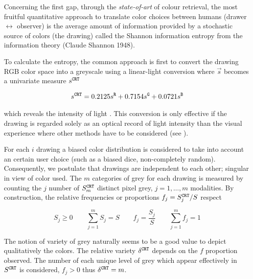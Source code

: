 \documentclass[11pt,a4paper]{article}
\begin{document}

Concerning the first gap, through the \emph{state-of-art} of colour
retrieval, the most fruitful quantitative approach to translate color
choices between humans (drawer \(\leftrightarrow\) observer) is the
average amount of information provided by a stochastic source of colors
(the drawing) called the Shannon information entropy from the
information theory (Claude Shannon 1948).

To calculate the entropy, the common approach is first to convert the
drawing RGB color space into a greyscale using a linear-light conversion
where \(\vec{s}\) becomes a univariate measure \(s^{\tt \tiny CRT}\)

\[s^{\tt \scriptstyle CRT} = 0.2125s^{\tt \scriptstyle R} + 0.7154 s^{\tt \scriptstyle G}+ 0.0721 s^{\tt \scriptstyle B}\]

which reveals the intensity of light \cite{poynton1997}. This conversion
is only effective if the drawing is regarded solely as an optical record
of light intensity than the visual experience where other methods have
to be considered (see \cite{amy2005}).

For each \(i\) drawing a biased color distribution is considered to take
into account an certain user choice (such as a biased dice,
non-completely random). Consequently, we postulate that drawings are
independent to each other; singular in view of color used. The \(m\)
categories of grey for each drawing is measured by counting the \(j\)
number of \(S^{\tt \scriptstyle CRT}_m\) distinct pixel grey,
\(j = 1, \dots, m\) modalities. By construction, the relative
frequencies or proportions \(f_j = S^{\tt \scriptstyle CRT}_j/S\)
respect

\[S_j \geq 0 \qquad \sum_{j=1}^{m} S_j = S \qquad f_j = \frac{S_j}{S} \qquad \sum_{j=1}^{m} f_j = 1\]

The notion of variety of grey naturally seems to be a good value to
depict qualitatively the colors. The relative variety
\(\delta^{\tt \scriptstyle CRT}\) depends on the \(f\) proportion
observed. The number of each unique level of grey which appear
effectively in \(S^{\tt \scriptstyle CRT}\) is considered, \(f_j>0\)
thus \(\delta^{\tt \scriptstyle CRT} = m\).
\end{document}
